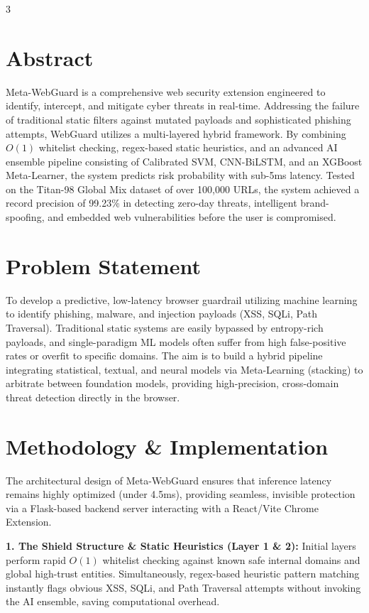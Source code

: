 \documentclass[a0,portrait,25pt]{a0poster}
\begin{document}
\begin{multicols}{3}

\section*{Abstract}
Meta-WebGuard is a comprehensive web security extension engineered to identify, intercept, and mitigate cyber threats in real-time. Addressing the failure of traditional static filters against mutated payloads and sophisticated phishing attempts, WebGuard utilizes a multi-layered hybrid framework. By combining $O(1)$ whitelist checking, regex-based static heuristics, and an advanced AI ensemble pipeline consisting of Calibrated SVM, CNN-BiLSTM, and an XGBoost Meta-Learner, the system predicts risk probability with sub-5ms latency. Tested on the Titan-98 Global Mix dataset of over 100,000 URLs, the system achieved a record precision of 99.23\% in detecting zero-day threats, intelligent brand-spoofing, and embedded web vulnerabilities before the user is compromised.

\section*{Problem Statement}
To develop a predictive, low-latency browser guardrail utilizing machine learning to identify phishing, malware, and injection payloads (XSS, SQLi, Path Traversal). Traditional static systems are easily bypassed by entropy-rich payloads, and single-paradigm ML models often suffer from high false-positive rates or overfit to specific domains. The aim is to build a hybrid pipeline integrating statistical, textual, and neural models via Meta-Learning (stacking) to arbitrate between foundation models, providing high-precision, cross-domain threat detection directly in the browser.

\section*{Methodology \& Implementation}

The architectural design of Meta-WebGuard ensures that inference latency remains highly optimized (under 4.5ms), providing seamless, invisible protection via a Flask-based backend server interacting with a React/Vite Chrome Extension.

\textbf{1. The Shield Structure \& Static Heuristics (Layer 1 \& 2):}
Initial layers perform rapid $O(1)$ whitelist checking against known safe internal domains and global high-trust entities. Simultaneously, regex-based heuristic pattern matching instantly flags obvious XSS, SQLi, and Path Traversal attempts without invoking the AI ensemble, saving computational overhead.


\end{multicols}
\end{document}
